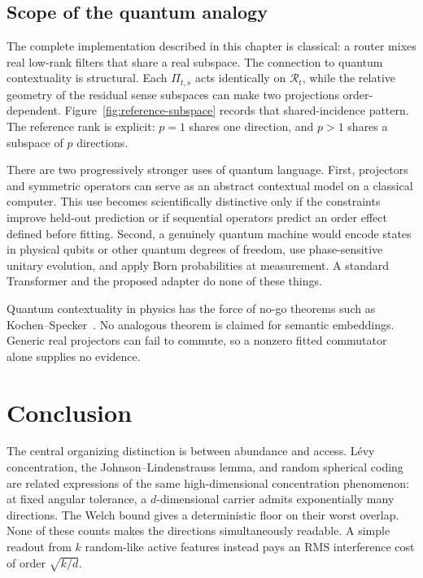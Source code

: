 \documentclass[
  aps,
  reprint,
  superscriptaddress,
  floatfix,
  nofootinbib,
  longbibliography
]{revtex4-2}
\begin{document}
\subsection{Scope of the quantum analogy}
\label{sec:quantum}

The complete implementation described in this chapter is classical: a router
mixes real low-rank filters that share a real subspace.  The connection to
quantum contextuality is structural.  Each $\Pi_{t,s}$ acts identically on
$\mathcal R_t$, while the relative geometry of the residual sense subspaces
can make two projections order-dependent.  Figure~\ref{fig:reference-subspace}
records that shared-incidence pattern.  The reference rank is explicit:
$p=1$ shares one direction, and $p>1$ shares a subspace of $p$ directions.

There are two progressively stronger uses of quantum language.  First,
projectors and symmetric operators can serve as an abstract contextual model
on a classical computer.  This use becomes scientifically distinctive only if
the constraints improve held-out prediction or if sequential operators predict
an order effect defined before fitting.  Second, a genuinely quantum machine
would encode states in physical qubits or other quantum degrees of freedom,
use phase-sensitive unitary evolution, and apply Born probabilities at
measurement.  A standard Transformer and the proposed adapter do none of
these things.

Quantum contextuality in physics has the force of no-go theorems such as
Kochen--Specker~\cite{specker-60,kochen1}.  No analogous theorem is claimed for
semantic embeddings.  Generic real projectors can fail to commute, so a
nonzero fitted commutator alone supplies no evidence.

\section{Conclusion}
\label{sec:conclusion}

The central organizing distinction is between abundance and access.
L\'evy concentration,
the Johnson--Lindenstrauss lemma, and random spherical coding are related
expressions of the same high-dimensional concentration phenomenon: at fixed
angular tolerance, a $d$-dimensional carrier admits exponentially many
directions.  The Welch bound gives a deterministic floor on their worst
overlap.  None of these counts makes the directions simultaneously readable.
A simple readout from $k$ random-like active features instead pays an RMS
interference cost of order $\sqrt{k/d}$.
\end{document}
